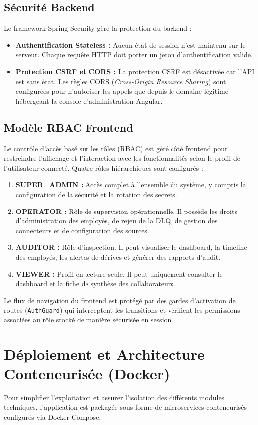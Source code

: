 \subsection{Sécurité Backend}
Le framework Spring Security gère la protection du backend :
\begin{itemize}
    \item \textbf{Authentification Stateless :} Aucun état de session n'est maintenu sur le serveur. Chaque requête HTTP doit porter un jeton d'authentification valide.
    \item \textbf{Protection CSRF et CORS :} La protection CSRF est désactivée car l'API est sans état. Les règles CORS (\textit{Cross-Origin Resource Sharing}) sont configurées pour n'autoriser les appels que depuis le domaine légitime hébergeant la console d'administration Angular.
\end{itemize}

\subsection{Modèle RBAC Frontend}
Le contrôle d'accès basé sur les rôles (RBAC) est géré côté frontend pour restreindre l'affichage et l'interaction avec les fonctionnalités selon le profil de l'utilisateur connecté. Quatre rôles hiérarchiques sont configurés :
\begin{enumerate}
    \item \textbf{SUPER\_ADMIN :} Accès complet à l'ensemble du système, y compris la configuration de la sécurité et la rotation des secrets.
    \item \textbf{OPERATOR :} Rôle de supervision opérationnelle. Il possède les droits d'administration des employés, de rejeu de la DLQ, de gestion des connecteurs et de configuration des sources.
    \item \textbf{AUDITOR :} Rôle d'inspection. Il peut visualiser le dashboard, la timeline des employés, les alertes de dérives et générer des rapports d'audit.
    \item \textbf{VIEWER :} Profil en lecture seule. Il peut uniquement consulter le dashboard et la fiche de synthèse des collaborateurs.
\end{enumerate}

Le flux de navigation du frontend est protégé par des gardes d'activation de routes (\texttt{AuthGuard}) qui interceptent les transitions et vérifient les permissions associées au rôle stocké de manière sécurisée en session.

\section{Déploiement et Architecture Conteneurisée (Docker)}
Pour simplifier l'exploitation et assurer l'isolation des différents modules techniques, l'application est packagée sous forme de microservices conteneurisés configurés via Docker Compose.

